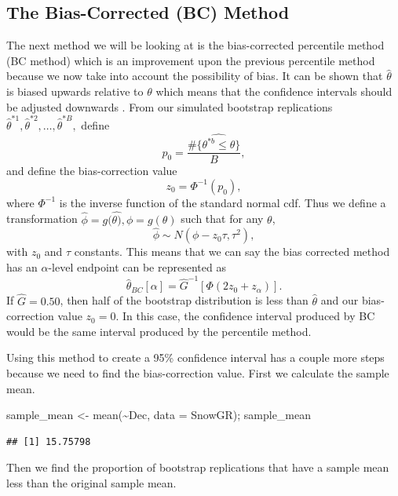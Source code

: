 \documentclass[12pt]{article}
\newenvironment{Shaded}{\begin{snugshade}}{\end{snugshade}}
\newcommand{\AttributeTok}[1]{\textcolor[rgb]{0.77,0.63,0.00}{#1}}
\newcommand{\FunctionTok}[1]{\textcolor[rgb]{0.00,0.00,0.00}{#1}}
\newcommand{\NormalTok}[1]{#1}
\newcommand{\OtherTok}[1]{\textcolor[rgb]{0.56,0.35,0.01}{#1}}
\newcommand{\SpecialCharTok}[1]{\textcolor[rgb]{0.00,0.00,0.00}{#1}}
\begin{document}
\hypertarget{the-bias-corrected-bc-method}{%
\subsection{The Bias-Corrected (BC)
Method}\label{the-bias-corrected-bc-method}}

The next method we will be looking at is the bias-corrected percentile
method (BC method) which is an improvement upon the previous percentile
method because we now take into account the possibility of bias. It can
be shown that \(\hat{\theta}\) is biased upwards relative to \(\theta\)
which means that the confidence intervals should be adjusted downwards
\citep[\citet{EfronCasi}]{Efron86}. From our simulated bootstrap
replications
\(\hat{\theta}^{*1}, \hat{\theta}^{*2}, \dots ,\hat{\theta}^{*B},\)
define \[p_0 = \frac{\#\{\hat{\theta^{*b} \leq \theta}\}}{B},\] and
define the bias-correction value \[z_0 = \Phi^{-1}(p_0),\] where
\(\Phi^{-1}\) is the inverse function of the standard normal cdf. Thus
we define a transformation
\(\hat{\phi} = g(\hat{\theta)}, \phi = g(\theta)\) such that for any
\(\theta\), \[\hat{\phi} \sim N(\phi - z_0\tau, \tau^2),\] with \(z_0\)
and \(\tau\) constants. This means that we can say the bias corrected
method has an \(\alpha\)-level endpoint can be represented as
\[\hat{\theta}_{BC}[\alpha] = \hat{G}^{-1} \left [ \Phi \left ( 2z_0 + z_\alpha\right ) \right ].\]
If \(\hat{G} = 0.50\), then half of the bootstrap distribution is less
than \(\hat{\theta}\) and our bias-correction value \(z_0 = 0\). In this
case, the confidence interval produced by BC would be the same interval
produced by the percentile method.

Using this method to create a 95\% confidence interval has a couple more
steps because we need to find the bias-correction value. First we
calculate the sample mean.

\begin{Shaded}
\begin{Highlighting}[]
\NormalTok{sample\_mean }\OtherTok{\textless{}{-}} \FunctionTok{mean}\NormalTok{(}\SpecialCharTok{\textasciitilde{}}\NormalTok{Dec, }\AttributeTok{data =}\NormalTok{ SnowGR); sample\_mean}
\end{Highlighting}
\end{Shaded}

\begin{verbatim}
## [1] 15.75798
\end{verbatim}

Then we find the proportion of bootstrap replications that have a sample
mean less than the original sample mean.
\end{document}

